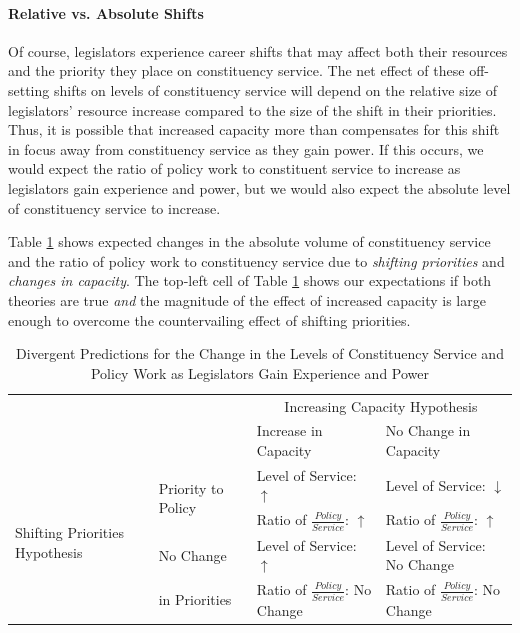 \documentclass[12pt]{article}
\begin{document}
\paragraph{Relative vs. Absolute Shifts} Of course, legislators experience career shifts that may affect both their resources and the priority they place on constituency service. The net effect of these off-setting shifts on levels of constituency service will depend on the relative size of legislators' resource increase compared to the size of the shift in their priorities. Thus, it is possible that increased capacity more than compensates for this shift in focus away from constituency service as they gain power.
If this occurs, we would expect the ratio of policy work to constituent service to increase as legislators gain experience and power, but we would also expect the absolute level of constituency service to increase.


Table \ref{t:theory} shows expected changes in the absolute volume of constituency service and the ratio of policy work to constituency service due to \textit{shifting priorities} and \textit{changes in capacity}. The top-left cell of Table \ref{t:theory} shows our expectations if both theories are true \textit{and} the magnitude of the effect of increased capacity is large enough to overcome the countervailing effect of shifting priorities.

\begin{table}[]
\caption{Divergent Predictions for the Change in the Levels of Constituency Service and Policy Work as Legislators Gain Experience and Power}\label{t:theory}

\begin{tabular}{p{.15\linewidth}|p{.20\linewidth}|p{.32\linewidth}|p{.33\linewidth}|}
\hline
\multicolumn{2}{l}{\multirow{2}{*}{}} & \multicolumn{2}{|c|}{Increasing Capacity Hypothesis} \\ \cline{3-4}
\multicolumn{2}{l|}{}    &  Increase in Capacity  &   No Change in Capacity \\ \cline{1-4} 
\multirow{4}{1.8cm}{Shifting Priorities Hypothesis}  &   \multirow{2}{2cm}{Priority to Policy}   &  Level of Service: $\uparrow$  &  Level of Service: $\downarrow$  \\ 
& &  Ratio of $\frac{Policy}{Service}$: $\uparrow$   &   Ratio of $\frac{Policy}{Service}$: $\uparrow$  \\ \cline{2-4}
 &  No Change    &  Level of Service: $\uparrow$  & Level of Service: No Change \\ 
 & in Priorities &   Ratio of $\frac{Policy}{Service}$: No Change  & Ratio of $\frac{Policy}{Service}$: No Change\\ \hline
\end{tabular}
\end{table}
\end{document}
